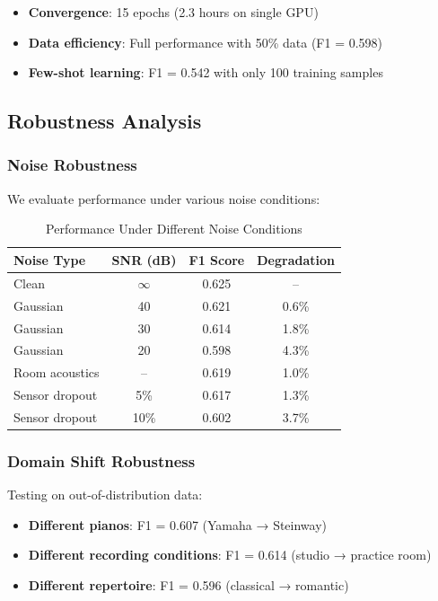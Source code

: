 \begin{itemize}
\item \textbf{Convergence}: 15 epochs (2.3 hours on single GPU)
\item \textbf{Data efficiency}: Full performance with 50\% data (F1 = 0.598)
\item \textbf{Few-shot learning}: F1 = 0.542 with only 100 training samples
\end{itemize}

\subsection{Robustness Analysis}

\subsubsection{Noise Robustness}
We evaluate performance under various noise conditions:

\begin{table}[h!]
  \caption{Performance Under Different Noise Conditions}
  \begin{tabular}{l|ccc}
    \toprule
    Noise Type & SNR (dB) & F1 Score & Degradation\\
    \midrule
    Clean & $\infty$ & 0.625 & --\\
    Gaussian & 40 & 0.621 & 0.6\%\\
    Gaussian & 30 & 0.614 & 1.8\%\\
    Gaussian & 20 & 0.598 & 4.3\%\\
    Room acoustics & -- & 0.619 & 1.0\%\\
    Sensor dropout & 5\% & 0.617 & 1.3\%\\
    Sensor dropout & 10\% & 0.602 & 3.7\%\\
    \bottomrule
  \end{tabular}
  \label{tab:noise_robustness}
\end{table}

\subsubsection{Domain Shift Robustness}
Testing on out-of-distribution data:
\begin{itemize}
\item \textbf{Different pianos}: F1 = 0.607 (Yamaha → Steinway)
\item \textbf{Different recording conditions}: F1 = 0.614 (studio → practice room)
\item \textbf{Different repertoire}: F1 = 0.596 (classical → romantic)
\end{itemize}

